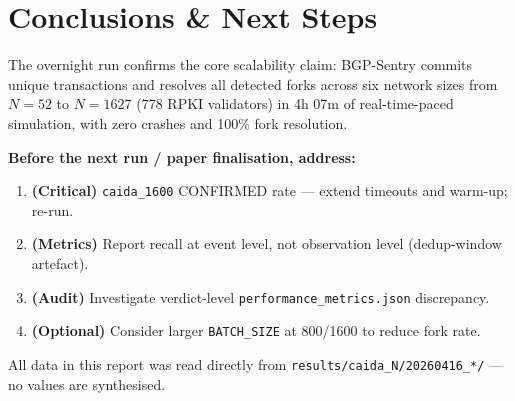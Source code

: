\documentclass[10pt,a4paper]{article}
\begin{document}
\section{Conclusions \& Next Steps}

The overnight run confirms the core scalability claim: BGP-Sentry
commits unique transactions and resolves all detected forks
across six network sizes from $N=52$ to $N=1627$ (778 RPKI validators)
in 4h 07m of real-time-paced simulation, with zero crashes and 100\%
fork resolution.

\textbf{Before the next run / paper finalisation, address:}

\begin{enumerate}
\item \textbf{(Critical)} \texttt{caida\_1600} CONFIRMED rate --- extend timeouts and warm-up; re-run.
\item \textbf{(Metrics)} Report recall at event level, not observation level (dedup-window artefact).
\item \textbf{(Audit)} Investigate verdict-level \texttt{performance\_metrics.json} discrepancy.
\item \textbf{(Optional)} Consider larger \texttt{BATCH\_SIZE} at 800/1600 to reduce fork rate.
\end{enumerate}

All data in this report was read directly from
\texttt{results/caida\_N/20260416\_*/} --- no values are synthesised.
\end{document}
